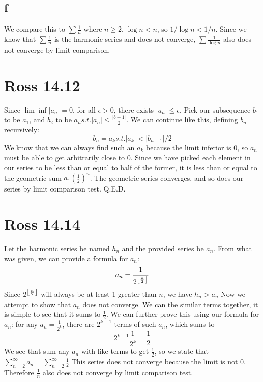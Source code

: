 \documentclass[12pt]{article}
\DeclarePairedDelimiter\floor{\lfloor}{\rfloor}
\begin{document}
\subsection{f}
We compare this to $\sum \frac{1}{n}$ where $n \geq 2$. $\log n < n$, so $1/\log n < 1/ n$. Since we know that $\sum \frac{1}{n}$ is the harmonic series and does not converge, $\sum \frac{1}{\log n}$ also does not converge by limit comparison.
\newpage


\section{Ross 14.12}
Since $\lim \inf |a_n|=0$, for all $\epsilon > 0$, there exists $|a_n|\leq \epsilon$.
\newline
Pick our subsequence $b_1$ to be $a_1$, and $b_2$ to be $a_n s.t. |a_n|\leq\frac{|b-1|}{2}$. We can continue like this, defining $b_n$ recursively:
$$b_n = a_k s.t. |a_k|<|b_{n-1}|/2$$
We know that we can always find such an $a_k$ because the limit inferior is 0, so $a_n$ must be able to get arbitrarily close to 0.
\newline
Since we have picked each element in our series to be less than or equal to half of the former, it is less than or equal to the geometric sum $a_1(\frac{1}{2})^n$. The geometric series converges, and so does our series by limit comparison test.
Q.E.D.
\newpage

\section{Ross 14.14}
Let the harmonic series be named $h_n$ and the provided series be $a_n$.
\newline
From what was given, we can provide a formula for $a_n$: $$a_n = \frac{1}{2^{\floor*{\frac{n}{2}}}}$$
\newline
Since $2^{\floor*{\frac{n}{2}}}$ will always be at least 1 greater than $n$, we have $h_n > a_n$
\newline
Now we attempt to show that $a_n$ does not converge. We can the similar terms together, it is simple to see that it sums to $\frac{1}{2}$. We can further prove this using our formula for $a_n$: for any $a_n = \frac{1}{2^k}$, there are $2^{k-1}$ terms of such $a_n$, which sums to
$$2^{k-1}\frac{1}{2^k} = \frac{1}{2}$$
We see that sum any $a_n$ with like terms to get $\frac{1}{2}$, so we state that $\sum_{n=2}^\infty a_n = \sum_{n=2}^\infty \frac{1}{2}$
\newline
This series does not converge because the limit is not 0. Therefore $\frac{1}{n}$ also does not converge by limit comparison test.
\newpage
\end{document}
